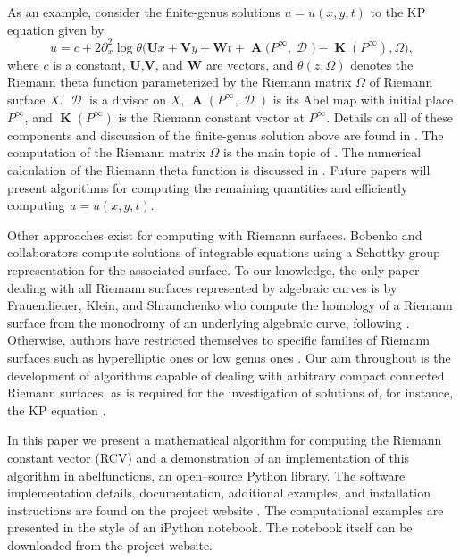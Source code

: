 \documentclass[12pt]{article}
\theoremstyle{definition}
\DeclareMathOperator{\DivD}{\mathcal{D}}
\DeclareMathOperator{\RCV}{\boldsymbol{K}}
\DeclareMathOperator{\Abel}{\boldsymbol{A}}
\begin{document}
As an example, consider the finite-genus solutions $u = u(x,y,t)$ to the
KP equation given by
\begin{equation} \label{eqn:kp}
  u = c + 2 \partial_x^2 \log \theta\Big( \boldsymbol{U}x +
  \boldsymbol{V}y + \boldsymbol{W}t + \Abel\big(P^\infty,\DivD\big) -
  \RCV(P^\infty), \Omega \Big),
\end{equation}
where $c$ is a constant, $\boldsymbol{U}$,$\boldsymbol{V}$, and
$\boldsymbol{W}$ are vectors, and $\theta(z,\Omega)$ denotes the Riemann
theta function parameterized by the Riemann matrix $\Omega$ of Riemann
surface $X$. $\DivD$ is a divisor on $X$, $\Abel(P^\infty,\DivD)$ is its
Abel map with initial place $P^\infty$, and $\RCV(P^\infty)$ is the
Riemann constant vector at $P^\infty$. Details on all of these
components and discussion of the finite-genus solution above are found
in \cite{belokolos,Dubrovin81}. The computation of the Riemann matrix
$\Omega$ is the main topic of \cite{dvh1}. The numerical calculation of
the Riemann theta function is discussed in \cite{DHBvHS03}. Future
papers will present algorithms for computing the remaining quantities
and efficiently computing $u = u(x,y,t)$.

Other approaches exist for computing with Riemann surfaces. Bobenko and
collaborators \cite{belokolos, BobenkoBordag89} compute solutions of
integrable equations using a Schottky group representation for the
associated surface. To our knowledge, the only paper dealing with all
Riemann surfaces represented by algebraic curves is by Frauendiener,
Klein, and Shramchenko who compute the homology of a Riemann surface
from the monodromy of an underlying algebraic curve, following
\cite{dvh1}. Otherwise, authors have restricted themselves to specific
families of Riemann surfaces such as hyperelliptic ones
\cite{FrauendienerKlein06,FrauendienerKlein15} or low genus ones
\cite{DFS97,FinkelSegur85,DeconinckSwierczewski13}. Our aim throughout
is the development of algorithms capable of dealing with arbitrary
compact connected Riemann surfaces, as is required for the investigation
of solutions of, for instance, the KP equation \cite{DS98,Shiota86}.

In this paper we present a mathematical algorithm for computing the
Riemann constant vector (RCV) and a demonstration of an implementation
of this algorithm in {\sc abelfunctions}, an open--source Python
library. The software implementation details, documentation, additional
examples, and installation instructions are found on the project website
\cite{abelfunctions}. The computational examples are presented in the
style of an iPython notebook. The notebook itself can be downloaded from
the project website.
\end{document}
